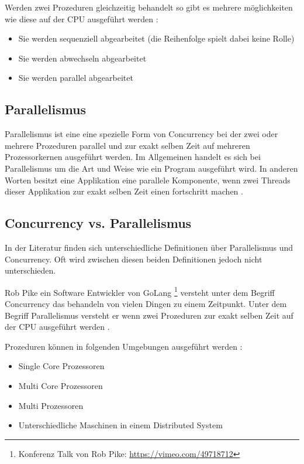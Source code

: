 Werden zwei Prozeduren gleichzeitig behandelt so gibt es mehrere möglichkeiten wie diese auf der CPU ausgeführt werden \cite[p. 14]{Erb2012}:

\begin{itemize}
  \item Sie werden sequenziell abgearbeitet (die Reihenfolge spielt dabei keine Rolle)
  \item Sie werden abwechseln abgearbeitet
  \item Sie werden parallel abgearbeitet
\end{itemize}

\subsection{Parallelismus}

Parallelismus ist eine eine spezielle Form von Concurrency bei der zwei oder mehrere Prozeduren parallel und  zur exakt selben Zeit auf mehreren Prozessorkernen ausgeführt werden. Im Allgemeinen handelt es sich bei Parallelismus um die Art und Weise wie ein Program ausgeführt wird. In anderen Worten besitzt eine Applikation eine parallele Komponente, wenn zwei Threads dieser Applikation zur exakt selben Zeit einen fortschritt machen \cite[]{oracle:multithreading}.

\subsection{Concurrency vs. Parallelismus}

In der Literatur finden sich unterschiedliche Definitionen über Parallelismus und Concurrency. Oft wird zwischen diesen beiden Definitionen jedoch nicht unterschieden. 

Rob Pike ein Software Entwickler von GoLang \footnote{Konferenz Talk von Rob Pike: \url{https://vimeo.com/49718712}} versteht unter dem Begriff Concurrency das behandeln von vielen Dingen zu einem Zeitpunkt. Unter dem Begriff Parallelismus versteht er wenn zwei Prozeduren zur exakt selben Zeit auf der CPU ausgeführt werden \cite[]{Pik2013}.

Prozeduren können in folgenden Umgebungen ausgeführt werden \cite[p. 14]{Erb2012}:

\begin{itemize}
  \item Single Core Prozessoren
  \item Multi Core Prozessoren
  \item Multi Prozessoren
  \item Unterschiedliche Maschinen in einem Distributed System
\end{itemize} 

